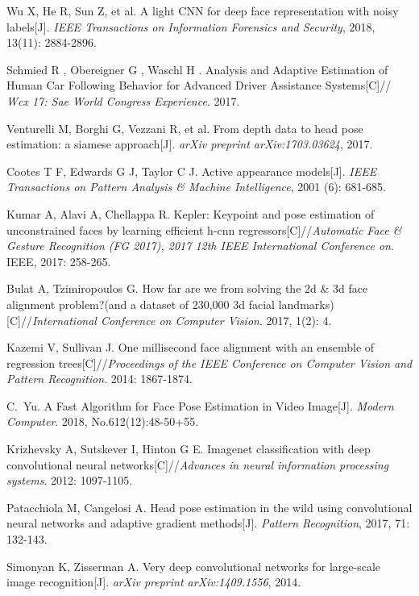 \documentclass[english]{DDCLSconf}
\begin{document}
\begin{thebibliography}{0}
\balance	
{} Wu X, He R, Sun Z, et al. A light CNN for deep face representation with noisy labels[J]. \emph{IEEE Transactions on Information Forensics and Security}, 2018, 13(11): 2884-2896.

 Schmied R , Obereigner G , Waschl H . Analysis and Adaptive Estimation of Human Car Following Behavior for Advanced Driver Assistance Systems[C]//\emph{ Wcx 17: Sae World Congress Experience}. 2017.%

 Venturelli M, Borghi G, Vezzani R, et al. From depth data to head pose estimation: a siamese approach[J]. \emph{arXiv preprint arXiv:1703.03624}, 2017.%

 Cootes T F, Edwards G J, Taylor C J. Active appearance models[J]. \emph{IEEE Transactions on Pattern Analysis \& Machine Intelligence}, 2001 (6): 681-685. %

 Kumar A, Alavi A, Chellappa R. Kepler: Keypoint and pose estimation of unconstrained faces by learning efficient h-cnn regressors[C]//\emph{Automatic Face \& Gesture Recognition (FG 2017), 2017 12th IEEE International Conference on}. IEEE, 2017: 258-265. %

 Bulat A, Tzimiropoulos G. How far are we from solving the 2d \& 3d face alignment problem?(and a dataset of 230,000 3d facial landmarks)[C]//\emph{International Conference on Computer Vision}. 2017, 1(2): 4.%

 Kazemi V, Sullivan J. One millisecond face alignment with an ensemble of regression trees[C]//\emph{Proceedings of the IEEE Conference on Computer Vision and Pattern Recognition}. 2014: 1867-1874.%

C.~Yu. A Fast Algorithm for Face Pose Estimation in Video Image[J]. \emph{Modern Computer}. 2018, No.612(12):48-50+55.

 Krizhevsky A, Sutskever I, Hinton G E. Imagenet classification with deep convolutional neural networks[C]//\emph{Advances in neural information processing systems}. 2012: 1097-1105. %

 Patacchiola M, Cangelosi A. Head pose estimation in the wild using convolutional neural networks and adaptive gradient methods[J]. \emph{Pattern Recognition}, 2017, 71: 132-143.%

 Simonyan K, Zisserman A. Very deep convolutional networks for large-scale image recognition[J]. \emph{arXiv preprint arXiv:1409.1556}, 2014.


\end{thebibliography}
\end{document}
